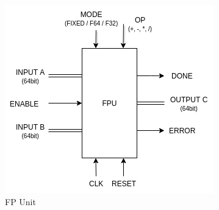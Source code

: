 \documentclass[12pt]{extarticle}
\begin{document}
\begin{figure}[hp]
    \centering
    \includegraphics[width=\textwidth]{FPU}
    \caption{FP Unit}
    \label{fig:fpu}
\end{figure}
\end{document}
